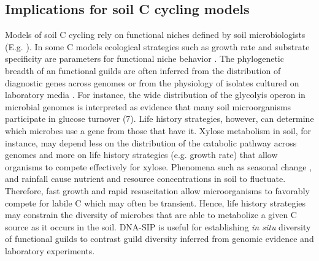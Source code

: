 \subsection{Implications for soil C cycling models}
Models of soil C cycling rely on functional niches defined by soil
microbiologists (E.g. \citep{wieder_2014a,Kaiser2014a}). In some C models
ecological strategies such as growth rate and substrate specificity are
parameters for functional niche behavior \citep{Kaiser2014a}. The phylogenetic
breadth of an functional guilds are often inferred from the distribution of
diagnostic genes across genomes \citep{Berlemont2013} or from the physiology of
isolates cultured on laboratory media \citep{Martiny2013}. For instance, the
wide distribution of the glycolyis operon in microbial genomes is interpreted
as evidence that many soil microorganisms participate in glucose turnover (7).
Life history strategies, however, can determine which microbes use a gene from
those that have it. Xylose metabolism in soil, for instance, may depend less on
the distribution of the catabolic pathway across genomes and more on life
history strategies (e.g. growth rate) that allow organisms to compete
effectively for xylose. Phenomena such as seasonal change
\citep{Schmidt2007}, and rainfall \citep{Evans2014a} cause nutrient and
resource concentrations in soil to fluctuate. Therefore, fast growth and rapid
resuscitation allow microorganisms to favorably compete for labile C which may
often be transient. Hence, life history strategies may constrain the diversity
of microbes that are able to metabolize a given C source as it occurs in the
soil. DNA-SIP is useful for establishing \textit{in situ} diversity of
functional guilds to contrast guild diversity inferred from genomic evidence
and laboratory experiments. 


